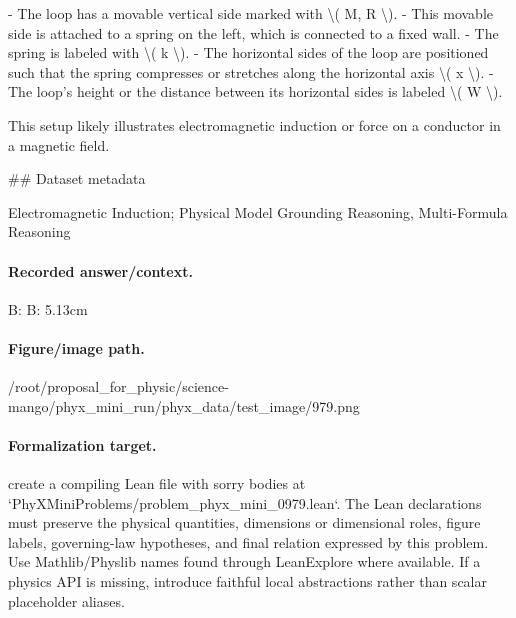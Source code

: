 - The loop has a movable vertical side marked with \textbackslash{}( M, R \textbackslash{}).
- This movable side is attached to a spring on the left, which is connected to a fixed wall.
- The spring is labeled with \textbackslash{}( k \textbackslash{}).
- The horizontal sides of the loop are positioned such that the spring compresses or stretches along the horizontal axis \textbackslash{}( x \textbackslash{}).
- The loop's height or the distance between its horizontal sides is labeled \textbackslash{}( W \textbackslash{}).

This setup likely illustrates electromagnetic induction or force on a conductor in a magnetic field.

\#\# Dataset metadata

Electromagnetic Induction; Physical Model Grounding Reasoning, Multi-Formula Reasoning

\paragraph{Recorded answer/context.}
B: B: 5.13cm

\paragraph{Figure/image path.}
/root/proposal\_for\_physic/science-mango/phyx\_mini\_run/phyx\_data/test\_image/979.png

\paragraph{Formalization target.}
create a compiling Lean file with sorry bodies at `PhyXMiniProblems/problem\_phyx\_mini\_0979.lean`. The Lean declarations must preserve the physical quantities, dimensions or dimensional roles, figure labels, governing-law hypotheses, and final relation expressed by this problem.
Use Mathlib/Physlib names found through LeanExplore where available. If a physics API is missing, introduce faithful local abstractions rather than scalar placeholder aliases.

